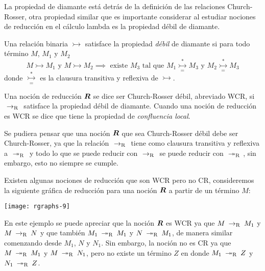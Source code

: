 La propiedad de diamante está detrás de la definición de las relaciones Church-Rosser, otra propiedad similar que es importante considerar al estudiar nociones de reducción en el cálculo lambda es la propiedad débil de diamante.

\begin{defn}
  Una relación binaria \( \rightarrowtail \) satisface la propiedad \emph{débil} de diamante si para todo término \( M \), \( M_{1} \) y \( M_{2} \)
  \[ M \rightarrowtail M_{1} \text{ y } M \rightarrowtail M_{2} \implies \text{ existe } M_{3} \text{ tal que } M_{1} \underset{=}{\overset{*}{\rightarrowtail}} M_{3} \text{ y } M_{2} \underset{=}{\overset{*}{\rightarrowtail}} M_{3} \]
  donde \( \underset{=}{\overset{*}{\rightarrowtail}} \) es la clausura transitiva y reflexiva de \( \rightarrowtail \).
\end{defn}

\begin{defn}
  Una noción de reducción \( \boldsymbol{R} \) se dice ser Church-Rosser débil, abreviado WCR, si \( \ \operatorname{\rightarrow_{R}}\  \) satisface la propiedad débil de diamante. Cuando una noción de reducción es WCR se dice que tiene la propiedad de \emph{confluencia local}.
\end{defn}

Se pudiera pensar que una noción \( \boldsymbol{R} \) que sea Church-Rosser débil debe ser Church-Rosser, ya que la relación \( \ \operatorname{\rightarrow_{R}}\  \) tiene como clausura transitiva y reflexiva a \( \ \operatorname{\twoheadrightarrow_{R}}\  \) y todo lo que se puede reducir con \( \ \operatorname{\rightarrow_{R}}\  \) se puede reducir con \( \ \operatorname{\twoheadrightarrow_{R}}\  \), sin embargo, esto no siempre se cumple.

Existen algunas nociones de reducción que son WCR pero no CR, consideremos la siguiente gráfica de reducción para una noción \( \boldsymbol{R} \) a partir de un término \( M \):

\begin{center}
  \texttt{[image: rgraphs-9]}
\end{center}

En este ejemplo se puede apreciar que la noción \( \boldsymbol{R} \) es WCR ya que \( M \ \operatorname{\rightarrow_{R}}\  M_{1} \) y \( M \ \operatorname{\rightarrow_{R}}\  N \) y que también \( M_{1} \ \operatorname{\twoheadrightarrow_{R}}\  M_{1} \) y \( N \ \operatorname{\twoheadrightarrow_{R}}\  M_{1} \), de manera similar comenzando desde \( M_{1} \), \( N \) y \( N_{1} \). Sin embargo, la noción no es CR ya que \( M \ \operatorname{\twoheadrightarrow_{R}}\  M_{1} \) y \( M \ \operatorname{\twoheadrightarrow_{R}}\  N_{1} \), pero no existe un término \( Z \) en donde \( M_{1} \ \operatorname{\twoheadrightarrow_{R}}\  Z \) y \( N_{1} \ \operatorname{\twoheadrightarrow_{R}}\  Z \).

